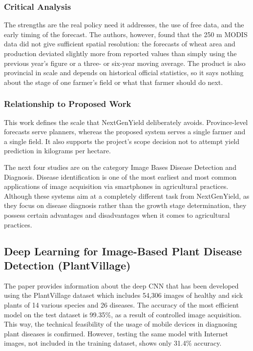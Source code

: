 \documentclass{FastFyp}
\begin{document}
\subsubsection{Critical Analysis}
The strengths are the real policy need it addresses, the use of free data, and the early timing of the forecast. The authors, however, found that the 250 m MODIS data did not give sufficient spatial resolution: the forecasts of wheat area and production deviated slightly more from reported values than simply using the previous year's figure or a three- or six-year moving average. The product is also provincial in scale and depends on historical official statistics, so it says nothing about the stage of one farmer's field or what that farmer should do next.

\subsubsection{Relationship to Proposed Work}
This work defines the scale that NextGenYield deliberately avoids. Province-level forecasts serve planners, whereas the proposed system serves a single farmer and a single field. It also supports the project's scope decision not to attempt yield prediction in kilograms per hectare.


The next four studies are on the category Image Bases Disease Detection and Diagnosis. Disease identification is one of the most earliest and most common applications of image acquisition via smartphones in agricultural practices. Although these systems aim at a completely different task from NextGenYield, as  they focus on disease diagnosis rather than the growth stage determination, they possess certain advantages and disadvantages when it comes to agricultural practices.
\subsection{Deep Learning for Image-Based Plant Disease Detection (PlantVillage)}

The paper \cite{ref:Mohanty:2016} provides information about the deep CNN that has been developed using the PlantVillage dataset which includes 54,306 images of healthy and sick plants of 14 various species and 26 diseases. The accuracy of the most efficient model on the test dataset is 99.35\%, as a result of controlled image acquisition. This way, the technical feasibility of the usage of mobile devices in diagnosing plant diseases is confirmed. However, testing the same model with Internet images, not included in the training dataset, shows only 31.4\% accuracy.
\end{document}
